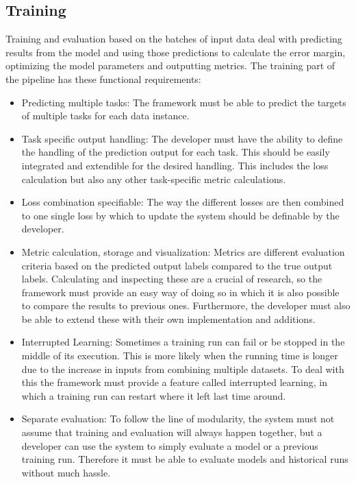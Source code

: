 \subsection{Training}

Training and evaluation based on the batches of input data deal with predicting results from the model and using those predictions to calculate the error margin, optimizing the model parameters and outputting metrics. The training part of the pipeline has these functional requirements:

\begin{itemize}

	\item Predicting multiple tasks: The framework must be able to predict the targets of multiple tasks for each data instance. 
	\item Task specific output handling: The developer must have the ability to define the handling of the prediction output for each task. This should be easily integrated and extendible for the desired handling. This includes the loss calculation but also any other task-specific metric calculations.
	\item Loss combination specifiable: The way the different losses are then combined to one single loss by which to update the system should be definable by the developer.
	\item Metric calculation, storage and visualization: Metrics are different evaluation criteria based on the predicted output labels compared to the true output labels. Calculating and inspecting these are a crucial of research, so the framework must provide an easy way of doing so in which it is also possible to compare the results to previous ones. Furthermore, the developer must also be able to extend these with their own implementation and additions.
	\item Interrupted Learning: Sometimes a training run can fail or be stopped in the middle of its execution. This is more likely when the running time is longer due to the increase in inputs from combining multiple datasets. To deal with this the framework must provide a feature called interrupted learning, in which a training run can restart where it left last time around.
	\item Separate evaluation: To follow the line of modularity, the system must not assume that training and evaluation will always happen together, but a developer can use the system to simply evaluate a model or a previous training run. Therefore it must be able to evaluate models and historical runs without much hassle.
\end{itemize}

